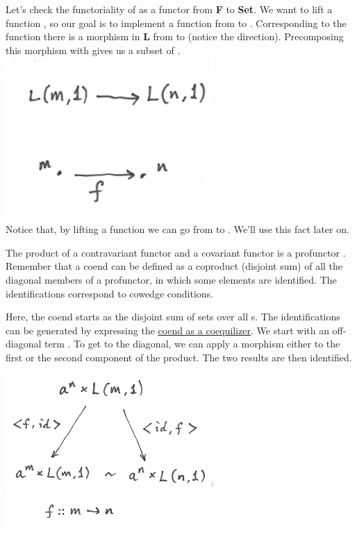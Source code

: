 Let's check the functoriality of  as a functor from
\textbf{F} to \textbf{Set}. We want to lift a function
, so our goal is to implement a
function from  to . Corresponding to
the function  there is a morphism in \textbf{L} from
 to  (notice the direction). Precomposing this
morphism with  gives us a subset of
.\\
\includegraphics[width=3.12500in]{images/liftl.png}\\
Notice that, by lifting a function  we can go
from  to . We'll use this fact later
on.

The product of a contravariant functor  and a covariant
functor  is a profunctor
. Remember that a coend can be defined
as a coproduct (disjoint sum) of all the diagonal members of a
profunctor, in which some elements are identified. The identifications
correspond to cowedge conditions.

Here, the coend starts as the disjoint sum of sets
 over all s. The identifications can
be generated by expressing the
\href{https://bartoszmilewski.com/2017/03/29/ends-and-coends/}{coend as
a coequilizer}. We start with an off-diagonal term
. To get to the diagonal, we can apply a
morphism  either to the first or
the second component of the product. The two results are then
identified.

\includegraphics[width=3.12500in]{images/equalize1.png}

